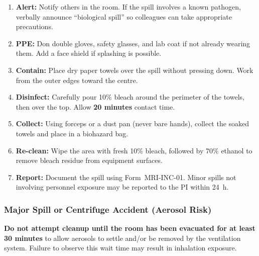 \begin{procedurebox}
\begin{enumerate}[leftmargin=1.6em, itemsep=3pt,
                  label=\textbf{\color{BSLmid}\arabic*.}]
  \item \textbf{Alert:} Notify others in the room. If the spill involves a known
        pathogen, verbally announce ``biological spill'' so colleagues can take
        appropriate precautions.
  \item \textbf{PPE:} Don double gloves, safety glasses, and lab coat if not
        already wearing them. Add a face shield if splashing is possible.
  \item \textbf{Contain:} Place dry paper towels over the spill without pressing
        down. Work from the outer edges toward the centre.
  \item \textbf{Disinfect:} Carefully pour 10\% bleach around the perimeter of
        the towels, then over the top. Allow \textbf{20 minutes} contact time.
  \item \textbf{Collect:} Using forceps or a dust pan (never bare hands), collect
        the soaked towels and place in a biohazard bag.
  \item \textbf{Re-clean:} Wipe the area with fresh 10\% bleach, followed by 70\%
        ethanol to remove bleach residue from equipment surfaces.
  \item \textbf{Report:} Document the spill using Form~MRI-INC-01. Minor spills
        not involving personnel exposure may be reported to the PI within 24~h.
\end{enumerate}
\end{procedurebox}

\subsubsection{Major Spill or Centrifuge Accident (Aerosol Risk)}

\begin{dangerbox}
\small
\textbf{Do not attempt cleanup until the room has been evacuated for at least
30 minutes} to allow aerosols to settle and/or be removed by the ventilation system.
Failure to observe this wait time may result in inhalation exposure.
\end{dangerbox}

